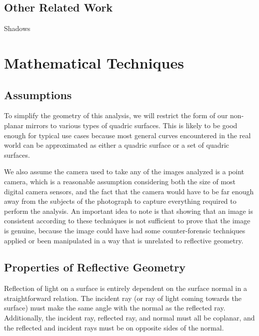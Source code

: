 \documentclass{article}
\begin{document}
\subsection{Other Related Work}
Shadows

\section{Mathematical Techniques}
\subsection{Assumptions}
To simplify the geometry of this analysis, we will restrict the form of our non-planar mirrors to various types of quadric surfaces. This is likely to be good enough for typical use cases because most general curves encountered in the real world can be approximated as either a quadric surface or a set of quadric surfaces.

We also assume the camera used to take any of the images analyzed is a point camera, which is a reasonable assumption considering both the size of most digital camera sensors, and the fact that the camera would have to be far enough away from the subjects of the photograph to capture everything required to perform the analysis.
An important idea to note is that showing that an image is consistent according to these techniques is not sufficient to prove that the image is genuine, because the image could have had some counter-forensic techniques applied or been manipulated in a way that is unrelated to reflective geometry.

\subsection{Properties of Reflective Geometry}
Reflection of light on a surface is entirely dependent on the surface normal in a straightforward relation. The incident ray (or ray of light coming towards the surface) must make the same angle with the normal as the reflected ray.  Additionally, the incident ray, reflected ray, and normal must all be coplanar, and the reflected and incident rays must be on opposite sides of the normal.
\end{document}

